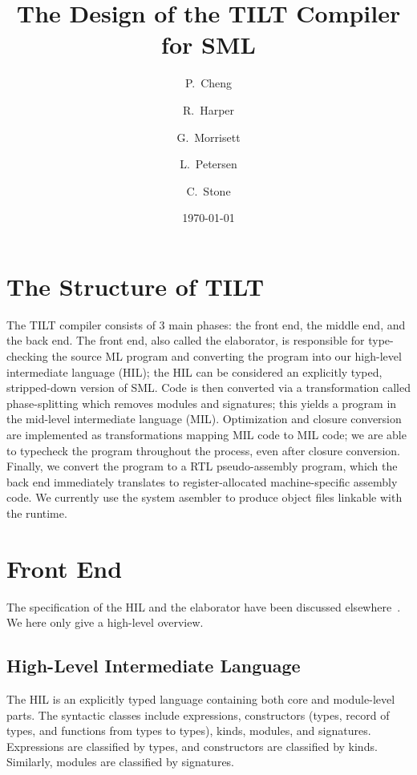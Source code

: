 \documentclass[twoside]{article}
\begin{document}
\title{The Design of the TILT Compiler for SML}
\author{P.~Cheng\and R.~Harper\and 
        G.~Morrisett\and L.~Petersen\and C.~Stone}
\date{\today}
\maketitle

\section{The Structure of TILT}

The TILT compiler consists of 3 main phases: the front end, the middle
end, and the back end.  The front end, also called the elaborator, is
responsible for type-checking the source ML program and converting the
program into our high-level intermediate language (HIL); the HIL can
be considered an explicitly typed, stripped-down version of SML.  Code
is then converted via a transformation called phase-splitting which
removes modules and signatures; this yields a program in the mid-level
intermediate language (MIL).  Optimization and closure conversion are
implemented as transformations mapping MIL code to MIL code; we are
able to typecheck the program throughout the process, even after
closure conversion.  Finally, we convert the program to a RTL
pseudo-assembly program, which the back end immediately translates to
register-allocated machine-specific assembly code.  We currently use
the system asembler to produce object files linkable with the runtime.

\section{Front End}

The specification of the HIL and the elaborator have been
discussed elsewhere~\cite{HS:milnervolume, HS:techreport}.
We here only give a high-level overview.

\subsection{High-Level Intermediate Language}

The HIL is an explicitly typed language containing both 
core and module-level parts.  The syntactic classes
include expressions, constructors (types, record of types,
and functions from types to types), kinds, modules, and signatures.
Expressions are classified by types, and constructors are classified
by kinds.  Similarly, modules are classified by signatures.
\end{document}
